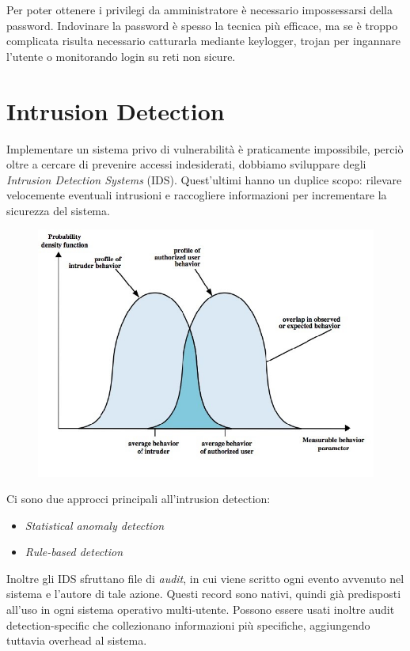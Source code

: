 \documentclass[a4paper, 11pt, twoside, openright, fleqn]{report}
\begin{document}
Per poter ottenere i privilegi da amministratore è necessario impossessarsi della password. Indovinare la password è spesso la tecnica più efficace, ma se è troppo complicata risulta necessario catturarla mediante keylogger, trojan per ingannare l'utente o monitorando login su reti non sicure.

\section{Intrusion Detection}
Implementare un sistema privo di vulnerabilità è praticamente impossibile, perciò oltre a cercare di prevenire accessi indesiderati, dobbiamo sviluppare degli \emph{Intrusion Detection Systems} (IDS). Quest'ultimi hanno un duplice scopo: rilevare velocemente eventuali intrusioni e raccogliere informazioni per incrementare la sicurezza del sistema.

\begin{figure}[htp]
	\centering
	\includegraphics[width=.8\textwidth]{images/IDSprinciples}
\end{figure}

\noindent
Ci sono due approcci principali all'intrusion detection:
\begin{itemize}
	\item \emph{Statistical anomaly detection}
	\item \emph{Rule-based detection}
\end{itemize}
Inoltre gli IDS sfruttano file di \emph{audit}, in cui viene scritto ogni evento avvenuto nel sistema e l'autore di tale azione. Questi record sono nativi, quindi già predisposti all'uso in ogni sistema operativo multi-utente. Possono essere usati inoltre audit detection-specific che collezionano informazioni più specifiche, aggiungendo tuttavia overhead al sistema.
\end{document}
